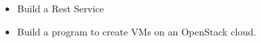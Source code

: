 
\begin{itemize}
\item Build a Rest Service
\item Build a program to create VMs on an OpenStack cloud.
\end{itemize}






\begin{comment}

\begin{longtable}{p{3cm}p{11cm}}
  \caption{Calendar} \\   
  \toprule
  Date & Activity \\
  \midrule
  \endfirsthead
  \toprule
  Date & Activity \\
  \endhead
  \hline
  \multicolumn{2}{c}{Continued}\\   \bottomrule
  \endfoot
  \bottomrule
  \endlastfoot

  Jan 8, Mon & Class Begins\\
  
  Jan 15, Mon 9am & Setup communication pathways for the class. (1)
  You must have created a github repository in our class repository.
  (2) You must be in the class Piazza.  (3) Motivation: if we can not
  communicate with you we can not conduct the class. Everyone must be
  in piazza and github timely.  \\

  Weekly & contribution to notebook.md \\
  Weekly & contribution to piazza and/or the Handbook \\

  Jan 15, Mon & MLK Jr. Day. Good day to work on projects, computer setup \\
  Jan 22, Mon 9am & Tutorial 1 \\
  Feb 5,  Mon 9am & Tutorial 2 \\
  Feb 26, Mon 9am & Paper 1 \\
  Mar 5, Mon 9am & Project draft paper due without panelty \\
  \hline
  Spring Break &\\
  Mar 11 - Mar 18.  & This is a good time to work ahead or catch up
  with things. We strongly advise to use this time wisely. \\
  \hline
  Mar 16, Mon 9am & Project reports due without penalty \\
  Mar 23, Mon 9am & Improvments to Projects and documents possible,
  but substential work must have been done before to not encounter a
  grade reduction \\
  May 1 & Any paper submitted after May 1st will get an
  incomplete and a grade reduction. \\
\end{longtable}
\end{comment}


